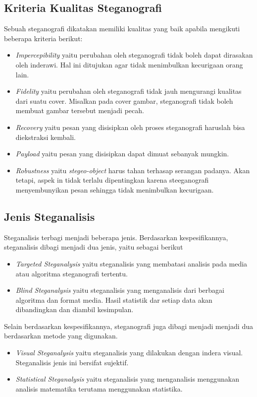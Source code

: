 \documentclass[10pt,conference]{IEEEtran}
\theoremstyle{definition}
\begin{document}
\subsection{Kriteria Kualitas Steganografi}
Sebuah steganografi dikatakan memiliki kualitas yang baik apabila mengikuti beberapa kriteria berikut: \cite{b1}

\begin{itemize}
    \item \emph{Impercepibility} yaitu perubahan oleh steganografi tidak boleh dapat dirasakan oleh inderawi. Hal ini ditujukan agar
    tidak menimbulkan kecurigaan orang lain.
    \item \emph{Fidelity} yaitu perubahan oleh steganografi tidak jauh mengurangi kualitas dari suatu cover. Misalkan pada cover gambar,
    steganografi tidak boleh membuat gambar tersebut menjadi pecah.
    \item \emph{Recovery} yaitu pesan yang disisipkan oleh proses steganografi haruslah bisa diekstraksi kembali.
    \item \emph{Payload} yaitu pesan yang disisipkan dapat dimuat sebanyak mungkin.
    \item \emph{Robustness} yaitu \emph{stegeo-object} harus tahan terhasap serangan padanya. Akan tetapi, aspek in
    tidak terlalu dipentingkan karena steeganografi menyembunyikan pesan sehingga tidak menimbulkan kecurigaan.
\end{itemize}

\subsection{Jenis Steganalisis}
Steganalisis terbagi menjadi beberapa jenis. Berdasarkan kespesifikannya, steganalisis dibagi menjadi dua jenis, yaitu sebagai berikut \cite{b1}
\begin{itemize}
    \item \emph{Targeted Steganalysis} yaitu steganalisis yang membatasi analisis pada media atau algoritma steganografi tertentu. 
    \item \emph{Blind Steganalysis} yaitu steganalisis yang menganalisis dari berbagai algoritma dan format media. Hasil statistik dar
    setiap data akan dibandingkan dan diambil kesimpulan.
\end{itemize}

Selain berdasarkan kespesifikannya, steganografi juga dibagi menjadi menjadi dua berdasarkan metode yang digunakan.
\begin{itemize}
    \item \emph{Visual Steganalysis} yaitu steganalisis yang dilakukan dengan indera visual. Steganalisis jenis ini bersifat sujektif.
    \item \emph{Statistical Steganalysis} yaitu steganalisis yang menganalisis menggunakan analisis matematika terutama menggunakan statistika.
\end{itemize}
\end{document}
